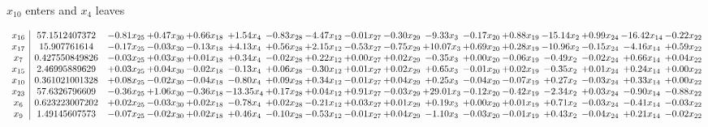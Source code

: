 \documentclass[9pt]{article}
\begin{document}
 $ x_{10} $ enters and $ x_{4} $ leaves 

 \[\begin{array}{c| c c@{\hskip 2pt} c@{\hskip 2pt} c@{\hskip 2pt} c@{\hskip 2pt} c@{\hskip 2pt} c@{\hskip 2pt} c@{\hskip 2pt} c@{\hskip 2pt} c@{\hskip 2pt} c@{\hskip 2pt} c@{\hskip 2pt} c@{\hskip 2pt} c@{\hskip 2pt} c@{\hskip 2pt} c@{\hskip 2pt} }
 x_{16}   &  57.1512407372 & -0.81 x_{25} & +  0.47 x_{30} & +  0.66 x_{18} & +  1.54 x_{4} & -0.83 x_{28} & -4.47 x_{12} & -0.01 x_{27} & -0.30 x_{29} & -9.33 x_{3} & -0.17 x_{20} & +  0.88 x_{19} & -15.14 x_{2} & +  0.99 x_{24} & -16.42 x_{14} & -0.22 x_{22}\\
 x_{17}   &  15.907761614 & -0.17 x_{25} & -0.03 x_{30} & -0.13 x_{18} & +  4.13 x_{4} & +  0.56 x_{28} & +  2.15 x_{12} & -0.53 x_{27} & -0.75 x_{29} & + 10.07 x_{3} & +  0.69 x_{20} & +  0.28 x_{19} & -10.96 x_{2} & -0.15 x_{24} & -4.16 x_{14} & +  0.59 x_{22}\\
 x_{7}   &  0.427550849826 & -0.03 x_{25} & +  0.03 x_{30} & +  0.01 x_{18} & +  0.34 x_{4} & -0.02 x_{28} & +  0.22 x_{12} & +  0.00 x_{27} & +  0.02 x_{29} & -0.35 x_{3} & +  0.00 x_{20} & -0.06 x_{19} & -0.49 x_{2} & -0.02 x_{24} & +  0.66 x_{14} & +  0.04 x_{22}\\
 x_{15}   &  2.46995889629 & +  0.03 x_{25} & +  0.04 x_{30} & -0.02 x_{18} & -0.13 x_{4} & +  0.06 x_{28} & -0.30 x_{12} & +  0.01 x_{27} & +  0.02 x_{29} & +  0.65 x_{3} & -0.01 x_{20} & +  0.02 x_{19} & -0.35 x_{2} & +  0.01 x_{24} & +  0.24 x_{14} & +  0.00 x_{22}\\
 x_{10}   &  0.361021001328 & +  0.08 x_{25} & -0.02 x_{30} & -0.04 x_{18} & -0.80 x_{4} & +  0.09 x_{28} & +  0.34 x_{12} & -0.01 x_{27} & +  0.04 x_{29} & +  0.25 x_{3} & -0.04 x_{20} & -0.07 x_{19} & +  0.27 x_{2} & -0.03 x_{24} & +  0.33 x_{14} & +  0.00 x_{22}\\
 x_{23}   &  57.6326796609 & -0.36 x_{25} & +  1.06 x_{30} & -0.36 x_{18} & -13.35 x_{4} & +  0.17 x_{28} & +  0.04 x_{12} & +  0.91 x_{27} & -0.03 x_{29} & + 29.01 x_{3} & -0.12 x_{20} & -0.42 x_{19} & -2.34 x_{2} & +  0.03 x_{24} & -0.90 x_{14} & -0.88 x_{22}\\
 x_{6}   &  0.623223007202 & +  0.02 x_{25} & -0.03 x_{30} & +  0.02 x_{18} & -0.78 x_{4} & +  0.02 x_{28} & -0.21 x_{12} & +  0.03 x_{27} & +  0.01 x_{29} & +  0.19 x_{3} & +  0.00 x_{20} & +  0.01 x_{19} & +  0.71 x_{2} & -0.03 x_{24} & -0.41 x_{14} & -0.03 x_{22}\\
 x_{9}   &  1.49145607573 & -0.07 x_{25} & -0.02 x_{30} & +  0.02 x_{18} & +  0.46 x_{4} & -0.10 x_{28} & -0.53 x_{12} & -0.01 x_{27} & +  0.04 x_{29} & -1.10 x_{3} & -0.03 x_{20} & -0.01 x_{19} & +  0.43 x_{2} & -0.04 x_{24} & +  0.21 x_{14} & -0.02 x_{22}\\

\end{array}\]
\end{document}
